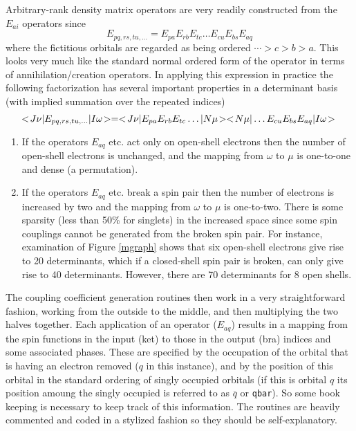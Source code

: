 \documentclass[fullpage,12pt,fleqn]{article}
\begin{document}
Arbitrary-rank density matrix operators are very readily constructed
from the $E_{ai}$ operators \cite{knowleseai} since
\begin{equation}
 E_{pq,rs,tu,\ldots} =
E_{pa}E_{rb}E_{tc}\ldots E_{cu}E_{bs}E_{aq}
\end{equation}
where the fictitious orbitals are regarded as being ordered
$\cdots>c>b>a$.  This looks very much like the standard normal ordered
form of the operator in terms of annihilation/creation operators.  In
applying this expression in practice the following factorization has
several important properties in a determinant basis (with implied
summation over the repeated indices)
\begin{equation}
 < \! J\nu |E_{pq,rs,tu,\ldots}| I \omega \! > = 
 < \! J\nu |E_{pa}E_{rb}E_{tc}\ldots |N\mu \! >
 < \! N\mu |\ldots E_{cu}E_{bs}E_{aq}|I\omega \! > \\
\end{equation}
\begin{enumerate}
\item If the operators $E_{aq}$ etc. act only on open-shell electrons
then the number of open-shell electrons is unchanged, and the mapping
from $\omega$ to $\mu$ is  one-to-one and dense (a permutation).
\item If the operators $E_{aq}$ etc. break a spin pair then the number
of electrons is increased by two and the mapping from $\omega$ to
$\mu$ is one-to-two.  There is some sparsity (less than 50\% for
singlets) in the increased space since some spin couplings cannot be
generated from the broken spin pair. For instance, examination of
Figure \ref{mgraph} shows that six open-shell electrons give rise to
20 determinants, which if a closed-shell spin pair is broken, can only
give rise to 40 determinants.  However, there are 70 determinants for
8 open shells.
\end{enumerate}

The coupling coefficient generation routines then work in a very
straightforward fashion, working from the outside to the middle, and
then multiplying the two halves together.  Each application of an
operator ($E_{aq}$) results in a mapping from the spin functions in
the input (ket) to those in the output (bra) indices and some
associated phases.  These are specified by the occupation of the
orbital that is having an electron removed ($q$ in this instance), and
by the position of this orbital in the standard ordering of singly
occupied orbitals (if this is orbital $q$ its position amoung the
singly occupied is referred to as $\overline{q}$ or \verb!qbar!).  So
some book keeping is necessary to keep track of this information.  The
routines are heavily commented and coded in a stylized fashion so they
should be self-explanatory.
\end{document}
